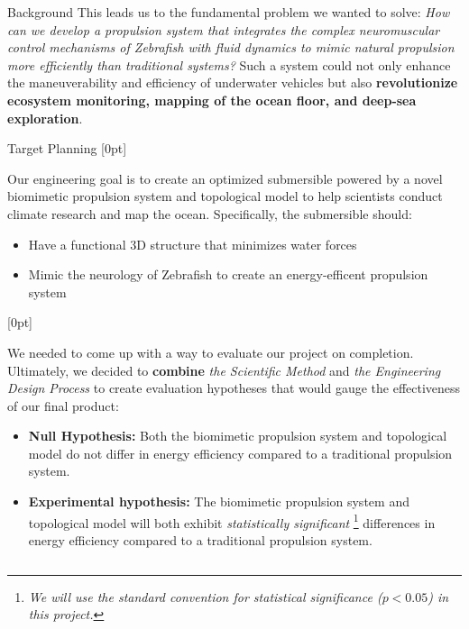 \documentclass[final, 16pt]{beamer}
\newlength{\colwidth}
\begin{document}
\begin{frame}[t]
\begin{columns}[t]
\begin{column}{\colwidth}
\begin{block}{Background}
    This leads us to the fundamental problem we wanted to solve: \emph{How can we develop a propulsion system that integrates the complex neuromuscular control mechanisms of Zebrafish with fluid dynamics to mimic natural propulsion more efficiently than traditional systems?} Such a system could not only enhance the maneuverability and efficiency of underwater vehicles but also \textbf{revolutionize ecosystem monitoring, mapping of the ocean floor, and deep-sea exploration}. 

  \end{block}

  \begin{block}{Target Planning}
    [0pt]

    Our engineering goal is to create an optimized submersible powered by a novel biomimetic propulsion system and topological model to help scientists conduct climate research and map the ocean. Specifically, the submersible should:

    \begin{itemize}
      \item Have a functional 3D structure that minimizes water forces
      \item Mimic the neurology of Zebrafish to create an energy-efficent propulsion system
    \end{itemize}

    [0pt]
    
    We needed to come up with a way to evaluate our project on completion. Ultimately, we decided to \textbf{combine} \emph{the Scientific Method} and \emph{the Engineering Design Process} to create evaluation hypotheses that would gauge the effectiveness of our final product:

    \begin{itemize}
    \item \textbf{Null Hypothesis:} Both the biomimetic propulsion system and topological model do not differ in energy efficiency compared to a traditional propulsion system.
    \item \textbf{Experimental hypothesis:} The biomimetic propulsion system and topological model will both exhibit \emph{statistically significant} \footnote{ \emph{We will use the standard convention for statistical significance ($p < 0.05$) in this project.}} differences in energy efficiency compared to a traditional propulsion system.
    \end{itemize}


\end{block}
\end{column}
\end{columns}
\end{frame}
\end{document}
